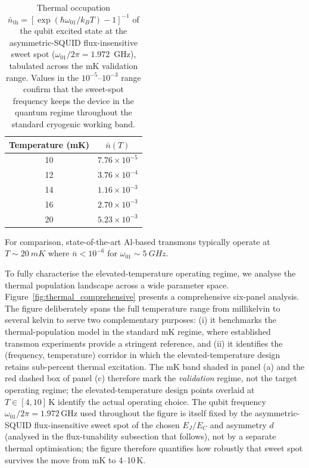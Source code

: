 \begin{table}[h]
\centering
\begin{tabular}{cc}
\hline
Temperature (mK) & $\bar{n}(T)$ \\
\hline
10 & $7.76 \times 10^{-5}$  \\
12 & $3.76 \times 10^{-4}$  \\
14 & $1.16 \times 10^{-3}$  \\
16 & $2.70 \times 10^{-3}$   \\
20 & $5.23 \times 10^{-3}$   \\
\hline
\end{tabular}
\caption{Thermal occupation $\bar{n}_{\text{th}} = [\exp(\hbar\omega_{01}/k_B T) - 1]^{-1}$ of the qubit excited state at the asymmetric-SQUID flux-insensitive sweet spot ($\omega_{01}/2\pi = 1.972$~GHz), tabulated across the mK validation range. Values in the $10^{-5}$--$10^{-3}$ range confirm that the sweet-spot frequency keeps the device in the quantum regime throughout the standard cryogenic working band.}
\label{tab:thermal}
\end{table}

 For comparison, state-of-the-art Al-based transmons typically operate at $T \sim \SI{20}{mK}$ where $\bar{n} < 10^{-6}$ for $\omega_{01} \sim \SI{5}{GHz}$.

To fully characterise the elevated-temperature operating regime, we analyse the thermal population landscape across a wide parameter space. Figure~\ref{fig:thermal_comprehensive} presents a comprehensive six-panel analysis. The figure deliberately spans the full temperature range from millikelvin to several kelvin to serve two complementary purposes: (i) it benchmarks the thermal-population model in the standard mK regime, where established transmon experiments provide a stringent reference, and (ii) it identifies the (frequency, temperature) corridor in which the elevated-temperature design retains sub-percent thermal excitation. The mK band shaded in panel (a) and the red dashed box of panel (c) therefore mark the \emph{validation} regime, not the target operating regime; the elevated-temperature design points overlaid at $T\in[4,10]\,\text{K}$ identify the actual operating choice. The qubit frequency $\omega_{01}/2\pi = 1.972\,\text{GHz}$ used throughout the figure is itself fixed by the asymmetric-SQUID flux-insensitive sweet spot of the chosen $E_J/E_C$ and asymmetry $d$ (analysed in the flux-tunability subsection that follows), not by a separate thermal optimisation; the figure therefore quantifies how robustly that sweet spot survives the move from mK to 4--10\,K.

